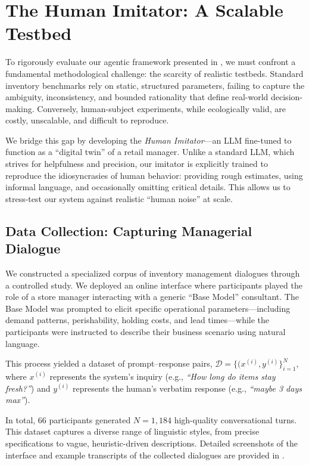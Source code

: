

\section{The Human Imitator: A Scalable Testbed}
\label{sec:imitator}

To rigorously evaluate our agentic framework presented in , we must confront a fundamental methodological challenge: the scarcity of realistic testbeds. Standard inventory benchmarks rely on static, structured parameters, failing to capture the ambiguity, inconsistency, and bounded rationality that define real-world decision-making. Conversely, human-subject experiments, while ecologically valid, are costly, unscalable, and difficult to reproduce.

We bridge this gap by developing the \emph{Human Imitator}—an LLM fine-tuned to function as a ``digital twin'' of a retail manager. Unlike a standard LLM, which strives for helpfulness and precision, our imitator is explicitly trained to reproduce the idiosyncrasies of human behavior: providing rough estimates, using informal language, and occasionally omitting critical details. This allows us to stress-test our system against realistic ``human noise'' at scale.

\subsection{Data Collection: Capturing Managerial Dialogue}

We constructed a specialized corpus of inventory management dialogues through a controlled study. We deployed an online interface where participants played the role of a store manager interacting with a generic ``Base Model'' consultant. The Base Model was prompted to elicit specific operational parameters—including demand patterns, perishability, holding costs, and lead times—while the participants were instructed to describe their business scenario using natural language.

This process yielded a dataset of prompt–response pairs, $\mathcal{D} = \{ (x^{(i)}, y^{(i)} \}_{i=1}^N$, where $x^{(i)}$ represents the system's inquiry (e.g., \emph{``How long do items stay fresh?''}) and $y^{(i)}$ represents the human's verbatim response (e.g., \emph{``maybe 3 days max''}). 

In total, $66$ participants generated $N = 1,184$ high-quality conversational turns. This dataset captures a diverse range of linguistic styles, from precise specifications to vague, heuristic-driven descriptions. Detailed screenshots of the interface and example transcripts of the collected dialogues are provided in .

